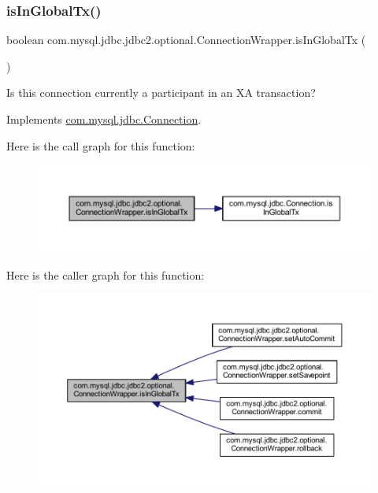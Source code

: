 \subsubsection{\texorpdfstring{is\+In\+Global\+Tx()}{isInGlobalTx()}}
{\footnotesize\ttfamily boolean com.\+mysql.\+jdbc.\+jdbc2.\+optional.\+Connection\+Wrapper.\+is\+In\+Global\+Tx (\begin{DoxyParamCaption}{ }\end{DoxyParamCaption})}

Is this connection currently a participant in an XA transaction? 

Implements \mbox{\hyperlink{interfacecom_1_1mysql_1_1jdbc_1_1_connection_a78a9a11946443467d3fbc7838922a205}{com.\+mysql.\+jdbc.\+Connection}}.

Here is the call graph for this function\+:
\nopagebreak
\begin{figure}[H]
\begin{center}
\leavevmode
\includegraphics[width=350pt]{classcom_1_1mysql_1_1jdbc_1_1jdbc2_1_1optional_1_1_connection_wrapper_a62dab37c7e8a78cbb34735cf016b9591_cgraph}
\end{center}
\end{figure}
Here is the caller graph for this function\+:
\nopagebreak
\begin{figure}[H]
\begin{center}
\leavevmode
\includegraphics[width=350pt]{classcom_1_1mysql_1_1jdbc_1_1jdbc2_1_1optional_1_1_connection_wrapper_a62dab37c7e8a78cbb34735cf016b9591_icgraph}
\end{center}
\end{figure}
\mbox{\label{classcom_1_1mysql_1_1jdbc_1_1jdbc2_1_1optional_1_1_connection_wrapper_a4259500598efa1b3dc8cf4317792338b}} 
